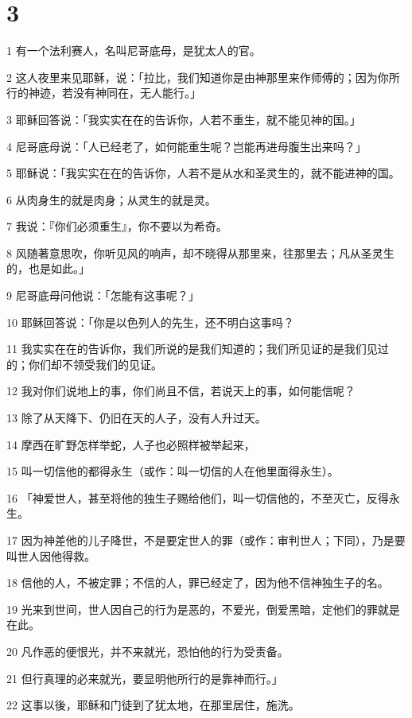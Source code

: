 \chapter{3}

\par 1 有一个法利赛人，名叫尼哥底母，是犹太人的官。
\par 2 这人夜里来见耶稣，说：「拉比，我们知道你是由神那里来作师傅的；因为你所行的神迹，若没有神同在，无人能行。」
\par 3 耶稣回答说：「我实实在在的告诉你，人若不重生，就不能见神的国。」
\par 4 尼哥底母说：「人已经老了，如何能重生呢？岂能再进母腹生出来吗？」
\par 5 耶稣说：「我实实在在的告诉你，人若不是从水和圣灵生的，就不能进神的国。
\par 6 从肉身生的就是肉身；从灵生的就是灵。
\par 7 我说：『你们必须重生』，你不要以为希奇。
\par 8 风随著意思吹，你听见风的响声，却不晓得从那里来，往那里去；凡从圣灵生的，也是如此。」
\par 9 尼哥底母问他说：「怎能有这事呢？」
\par 10 耶稣回答说：「你是以色列人的先生，还不明白这事吗？
\par 11 我实实在在的告诉你，我们所说的是我们知道的；我们所见证的是我们见过的；你们却不领受我们的见证。
\par 12 我对你们说地上的事，你们尚且不信，若说天上的事，如何能信呢？
\par 13 除了从天降下、仍旧在天的人子，没有人升过天。
\par 14 摩西在旷野怎样举蛇，人子也必照样被举起来，
\par 15 叫一切信他的都得永生（或作：叫一切信的人在他里面得永生）。
\par 16 「神爱世人，甚至将他的独生子赐给他们，叫一切信他的，不至灭亡，反得永生。
\par 17 因为神差他的儿子降世，不是要定世人的罪（或作：审判世人；下同），乃是要叫世人因他得救。
\par 18 信他的人，不被定罪；不信的人，罪已经定了，因为他不信神独生子的名。
\par 19 光来到世间，世人因自己的行为是恶的，不爱光，倒爱黑暗，定他们的罪就是在此。
\par 20 凡作恶的便恨光，并不来就光，恐怕他的行为受责备。
\par 21 但行真理的必来就光，要显明他所行的是靠神而行。」
\par 22 这事以後，耶稣和门徒到了犹太地，在那里居住，施洗。
